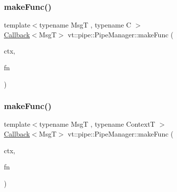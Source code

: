 \mbox{\label{structvt_1_1pipe_1_1_pipe_manager_a92427d0fbe9ee05aff71178147814c96}} 
\subsubsection{\texorpdfstring{make\+Func()}{makeFunc()}\hspace{0.1cm}{\footnotesize\ttfamily [2/6]}}
{\footnotesize\ttfamily template$<$typename MsgT , typename C $>$ \\
\hyperlink{namespacevt_a36db99df4c973d48b1118a293fff533f}{Callback}$<$MsgT$>$ vt\+::pipe\+::\+Pipe\+Manager\+::make\+Func (\begin{DoxyParamCaption}\item[{C $\ast$}]{ctx,  }\item[{\hyperlink{structvt_1_1pipe_1_1_pipe_manager_base_a73fdf82ece0411b3dc644c99b763f7a9}{Func\+Msg\+Ctx\+Type}$<$ MsgT, C $>$}]{fn }\end{DoxyParamCaption})}

\mbox{\label{structvt_1_1pipe_1_1_pipe_manager_adb73a299b634a180ae3814b41b9ce255}} 
\subsubsection{\texorpdfstring{make\+Func()}{makeFunc()}\hspace{0.1cm}{\footnotesize\ttfamily [3/6]}}
{\footnotesize\ttfamily template$<$typename MsgT , typename ContextT $>$ \\
\hyperlink{namespacevt_a36db99df4c973d48b1118a293fff533f}{Callback}$<$MsgT$>$ vt\+::pipe\+::\+Pipe\+Manager\+::make\+Func (\begin{DoxyParamCaption}\item[{ContextT $\ast$}]{ctx,  }\item[{\hyperlink{structvt_1_1pipe_1_1_pipe_manager_base_a73fdf82ece0411b3dc644c99b763f7a9}{Func\+Msg\+Ctx\+Type}$<$ MsgT, ContextT $>$}]{fn }\end{DoxyParamCaption})}



